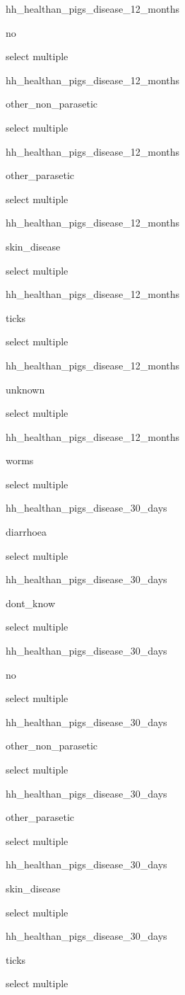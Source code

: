 \documentclass[]{article}
\begin{document}
hh\_healthan\_pigs\_disease\_12\_months

no

select multiple

hh\_healthan\_pigs\_disease\_12\_months

other\_non\_parasetic

select multiple

hh\_healthan\_pigs\_disease\_12\_months

other\_parasetic

select multiple

hh\_healthan\_pigs\_disease\_12\_months

skin\_disease

select multiple

hh\_healthan\_pigs\_disease\_12\_months

ticks

select multiple

hh\_healthan\_pigs\_disease\_12\_months

unknown

select multiple

hh\_healthan\_pigs\_disease\_12\_months

worms

select multiple

hh\_healthan\_pigs\_disease\_30\_days

diarrhoea

select multiple

hh\_healthan\_pigs\_disease\_30\_days

dont\_know

select multiple

hh\_healthan\_pigs\_disease\_30\_days

no

select multiple

hh\_healthan\_pigs\_disease\_30\_days

other\_non\_parasetic

select multiple

hh\_healthan\_pigs\_disease\_30\_days

other\_parasetic

select multiple

hh\_healthan\_pigs\_disease\_30\_days

skin\_disease

select multiple

hh\_healthan\_pigs\_disease\_30\_days

ticks

select multiple
\end{document}
